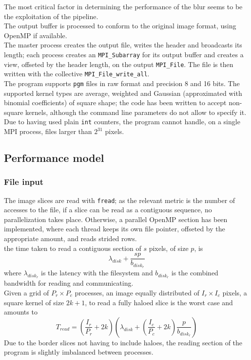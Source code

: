 \documentclass[a4paper, 11pt]{article}
\begin{document}
The most critical factor in determining the performance of the blur seems to be the exploitation of the pipeline.\\ 
The output buffer is processed to conform to the original image format, using OpenMP if available.\\
The master process creates the output file, writes the header and broadcasts its length; each process creates an \texttt{MPI\_Subarray} for its output buffer and creates a view, offseted by the header length, on the output \texttt{MPI\_File}. The file is then written with the collective \texttt{MPI\_File\_write\_all}.\\
The program supports \texttt{pgm} files in raw format and precision 8 and 16 bits. The supported kernel types are average, weighted and Gaussian (approximated with binomial coefficients) of square shape; the code has been written to accept non-square kernels, although the command line parameters do not allow to specify it.\\
Due to having used plain \texttt{int} counters, the program cannot handle, on a single MPI process, files larger than $2^{31}$ pixels.

\subsection{Performance model}
\subsubsection{File input}
The image slices are read with \texttt{fread}; as the relevant metric is the number of accesses to the file, if a slice can be read as a contiguous sequence, no parallelization takes place. Otherwise, a parallel OpenMP section has been implemented, where each thread keeps its own file pointer, offseted by the appropriate amount, and reads strided rows.\\
the time taken to read a contiguous section of $s$ pixels, of size $p$, is
$$\lambda_{disk} + \frac{s p}{b_{disk_r}}$$
where $\lambda_{disk_r}$ is the latency with the filesystem and $b_{disk_r}$ is the combined bandwidth for reading and communicating.\\
Given a grid of $P_r \times P_c$ processes, an image equally distributed of $I_r \times I_c$ pixels, a square kernel of size $2k+1$, to read a fully haloed slice is the worst case and amounts to
$$T_{read} = \left( \frac{I_r}{P_r} + 2k \right) \left( \lambda_{disk} + \left( \frac{I_c}{P_c} + 2k \right) \frac{p}{b_{disk_r}}  \right)$$
Due to the border slices not having to include haloes, the reading section of the program is slightly imbalanced between processes.
\end{document}
